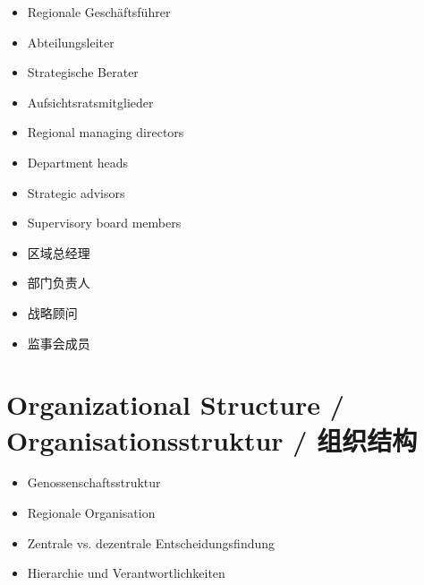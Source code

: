\begin{otherlanguage}{ngerman}
\begin{itemize}
    \item Regionale Geschäftsführer
    \item Abteilungsleiter
    \item Strategische Berater
    \item Aufsichtsratsmitglieder
\end{itemize}
\end{otherlanguage}

\begin{itemize}
    \item Regional managing directors
    \item Department heads
    \item Strategic advisors
    \item Supervisory board members
\end{itemize}

\begin{itemize}
    \item 区域总经理
    \item 部门负责人
    \item 战略顾问
    \item 监事会成员
\end{itemize}

\section{Organizational Structure / Organisationsstruktur / 组织结构}

\begin{otherlanguage}{ngerman}
\begin{itemize}
    \item Genossenschaftsstruktur
    \item Regionale Organisation
    \item Zentrale vs. dezentrale Entscheidungsfindung
    \item Hierarchie und Verantwortlichkeiten
\end{itemize}
\end{otherlanguage}

